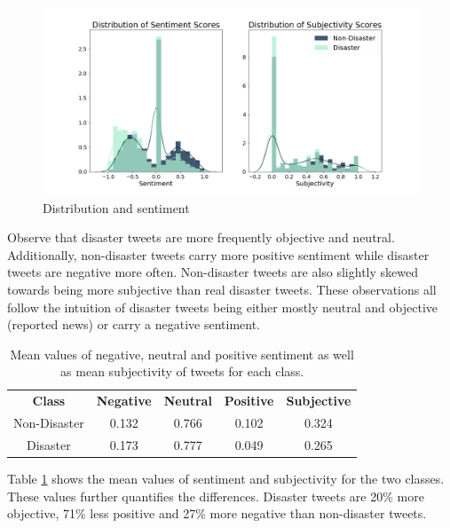 \documentclass[journal, ]{IEEEtran}
\let\MYoriglatexcaption\caption
\renewcommand{\caption}[2][\relax]{\MYoriglatexcaption[#2]{#2}}
\begin{document}
\begin{figure}[hbt!]
  \centering
  \includegraphics[width=\linewidth]{../figures/sent_sub_dist.png}
  \caption{Distribution and sentiment }
  \label{fig:sent_sub_dist}
\end{figure}

Observe that disaster tweets are more frequently objective and neutral.
Additionally, non-disaster tweets carry more positive sentiment while disaster
tweets are negative more often. Non-disaster tweets are also slightly skewed
towards being more subjective than real disaster tweets. These observations all
follow the intuition of disaster tweets being either mostly neutral and
objective (reported news) or carry a negative sentiment. 

\begin{table}[hbt!]
  \begin{center}
   \begin{tabular}{c|c|c|c|c} 
   \hline
    \textbf{Class} & \textbf{Negative} & \textbf{Neutral} & \textbf{Positive} & \textbf{Subjective}\\
    Non-Disaster & 0.132 & 0.766 & 0.102 & 0.324\\
    Disaster & 0.173 & 0.777 & 0.049 & 0.265\\
   \hline
  \end{tabular}
  \end{center}
  \caption{Mean values of negative, neutral and positive sentiment as well as
  mean subjectivity of tweets for each class.}
  \label{tab:sentiment}
\end{table}

Table \ref{tab:sentiment} shows the mean values of sentiment and
subjectivity for the two classes. These values further quantifies the
differences. Disaster tweets are 20\% more objective, 71\% less positive
and 27\% more negative than non-disaster tweets. 
\end{document}
